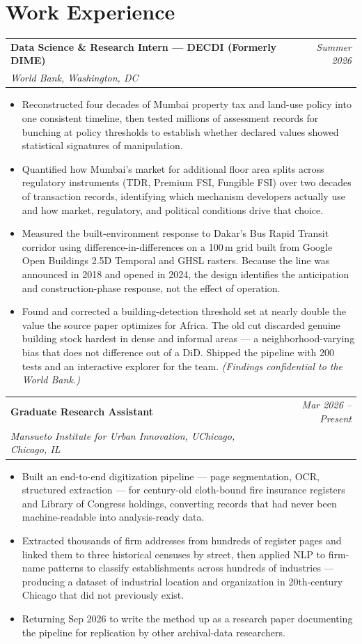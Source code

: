 \documentclass[10pt, letterpaper]{article}
\makeatletter
\newcommand{\cventry}[4]{%
  \noindent
  \begin{tabularx}{\linewidth}{@{}X r@{}}
    \textbf{#1} & \textit{\small #4} \\[0pt]
    \textit{\small #2, #3} & \\
  \end{tabularx}%
  \vspace{0pt}%
}
\makeatother
\begin{document}
\section{Work Experience}

\cventry{Data Science \& Research Intern — DECDI (Formerly DIME)}{World Bank}{Washington, DC}{Summer 2026}
\begin{itemize}
  \item Reconstructed four decades of Mumbai property tax and land-use policy into one consistent timeline, then tested millions of assessment records for bunching at policy thresholds to establish whether declared values showed statistical signatures of manipulation.
  \item Quantified how Mumbai's market for additional floor area splits across regulatory instruments (TDR, Premium FSI, Fungible FSI) over two decades of transaction records, identifying which mechanism developers actually use and how market, regulatory, and political conditions drive that choice.
  \item Measured the built-environment response to Dakar's Bus Rapid Transit corridor using difference-in-differences on a 100\,m grid built from Google Open Buildings 2.5D Temporal and GHSL rasters. Because the line was announced in 2018 and opened in 2024, the design identifies the anticipation and construction-phase response, not the effect of operation.
  \item Found and corrected a building-detection threshold set at nearly double the value the source paper optimizes for Africa. The old cut discarded genuine building stock hardest in dense and informal areas — a neighborhood-varying bias that does not difference out of a DiD. Shipped the pipeline with 200 tests and an interactive explorer for the team. \textit{(Findings confidential to the World Bank.)}
\end{itemize}

\vspace{3pt}

\cventry{Graduate Research Assistant}{Mansueto Institute for Urban Innovation, UChicago}{Chicago, IL}{Mar 2026 – Present}
\begin{itemize}
  \item Built an end-to-end digitization pipeline — page segmentation, OCR, structured extraction — for century-old cloth-bound fire insurance registers and Library of Congress holdings, converting records that had never been machine-readable into analysis-ready data.
  \item Extracted thousands of firm addresses from hundreds of register pages and linked them to three historical censuses by street, then applied NLP to firm-name patterns to classify establishments across hundreds of industries — producing a dataset of industrial location and organization in 20th-century Chicago that did not previously exist.
  \item Returning Sep 2026 to write the method up as a research paper documenting the pipeline for replication by other archival-data researchers.
\end{itemize}
\end{document}
